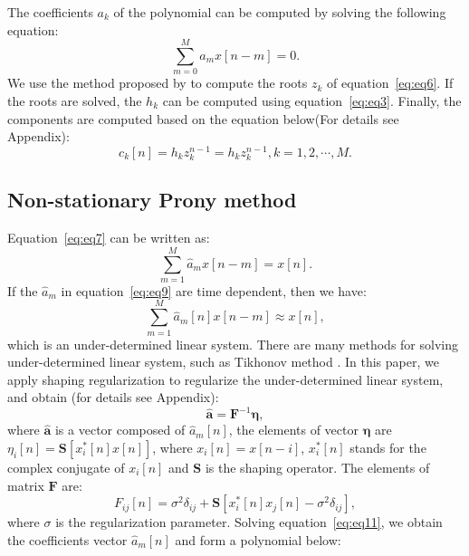 The coefficients $a_k$ of the polynomial can be computed by solving the following equation:
\begin{equation}
    \label{eq:eq7}
    \sum_{m=0}^{M}a_mx[n-m] = 0.
\end{equation}
We use the method proposed by \citet[]{roots} to compute the roots $z_k$ of equation~\ref{eq:eq6}. 
If the roots are solved, 
the $h_k$ can be computed using equation~\ref{eq:eq3}.
Finally, the components are 
computed based on the equation below(For details see Appendix):
\begin{equation}
    c_k[n] = h_kz_k^{n-1} = h_kz_k^{n-1}, k=1,2,\cdots,M.
\end{equation}

\subsection{Non-stationary Prony method}
Equation~\ref{eq:eq7} can be written as:
\begin{equation}
    \label{eq:eq9}
    \sum_{m=1}^{M}\hat{a}_m x[n-m] = x[n].
\end{equation}
If the $\hat{a}_m$ in equation~\ref{eq:eq9} are time dependent, then we have:
\begin{equation}
    \label{eq:eq10}
    \sum_{m=1}^{M}\hat{a}_m[n] x[n-m] \approx x[n],
\end{equation}
which is an under-determined linear system. There are many methods for solving under-determined 
linear system, such as Tikhonov method \cite[]{tikhonov}.
In this paper, we apply shaping regularization \cite[]{shape,lpf} to regularize
the under-determined linear system, and obtain (for details see Appendix):
\begin{equation}
    \label{eq:eq11}
    \mathbf{\hat{a}} = \mathbf{F}^{-1}\mathbf{\eta},
\end{equation}
where $\mathbf{\hat{a}}$ is a vector composed of $\hat{a}_m [n]$, 
the elements of vector $\mathbf{\eta}$ are 
$\eta_i[n] = \mathbf{S}[x_i^* [n] x[n]] $, where $x_i[n] = x[n-i]$, $x_i^*[n]$ stands for the complex conjugate of $x_i[n]$
and $\mathbf{S}$ is the shaping operator. 
The elements of matrix $\mathbf{F}$ are:
\begin{equation}
    \label{eq:eq12}
    {F}_{ij}[n] = \sigma^2 \delta_{ij} + \mathbf{S}[x_i^*[n]x_j[n] - \sigma^2 \delta_{ij}],
\end{equation}
where $\sigma$ is the regularization parameter.
Solving equation~\ref{eq:eq11}, we obtain the 
coefficients vector $\hat{a}_m[n]$ and form a polynomial below:

